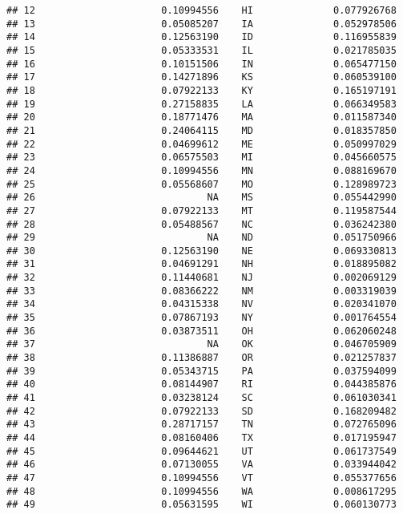 \documentclass{article}\usepackage[]{graphicx}\usepackage[]{color}
\makeatletter
\newenvironment{kframe}{%
 \def\at@end@of@kframe{}%
 \ifinner\ifhmode%
  \def\at@end@of@kframe{\end{minipage}}%
  \begin{minipage}{\columnwidth}%
 \fi\fi%
 \def\FrameCommand##1{\hskip\@totalleftmargin \hskip-\fboxsep
 \colorbox{shadecolor}{##1}\hskip-\fboxsep
     \hskip-\linewidth \hskip-\@totalleftmargin \hskip\columnwidth}%
 \MakeFramed {\advance\hsize-\width
   \@totalleftmargin\z@ \linewidth\hsize
   \@setminipage}}%
 {\par\unskip\endMakeFramed%
 \at@end@of@kframe}
\newenvironment{knitrout}{}{} %
\makeatother
\begin{document}
\begin{knitrout}
\begin{kframe}
\begin{verbatim}
## 12                      0.10994556    HI              0.077926768
## 13                      0.05085207    IA              0.052978506
## 14                      0.12563190    ID              0.116955839
## 15                      0.05333531    IL              0.021785035
## 16                      0.10151506    IN              0.065477150
## 17                      0.14271896    KS              0.060539100
## 18                      0.07922133    KY              0.165197191
## 19                      0.27158835    LA              0.066349583
## 20                      0.18771476    MA              0.011587340
## 21                      0.24064115    MD              0.018357850
## 22                      0.04699612    ME              0.050997029
## 23                      0.06575503    MI              0.045660575
## 24                      0.10994556    MN              0.088169670
## 25                      0.05568607    MO              0.128989723
## 26                              NA    MS              0.055442990
## 27                      0.07922133    MT              0.119587544
## 28                      0.05488567    NC              0.036242380
## 29                              NA    ND              0.051750966
## 30                      0.12563190    NE              0.069330813
## 31                      0.04691291    NH              0.018895082
## 32                      0.11440681    NJ              0.002069129
## 33                      0.08366222    NM              0.003319039
## 34                      0.04315338    NV              0.020341070
## 35                      0.07867193    NY              0.001764554
## 36                      0.03873511    OH              0.062060248
## 37                              NA    OK              0.046705909
## 38                      0.11386887    OR              0.021257837
## 39                      0.05343715    PA              0.037594099
## 40                      0.08144907    RI              0.044385876
## 41                      0.03238124    SC              0.061030341
## 42                      0.07922133    SD              0.168209482
## 43                      0.28717157    TN              0.072765096
## 44                      0.08160406    TX              0.017195947
## 45                      0.09644621    UT              0.061737549
## 46                      0.07130055    VA              0.033944042
## 47                      0.10994556    VT              0.055377656
## 48                      0.10994556    WA              0.008617295
## 49                      0.05631595    WI              0.060130773

\end{verbatim}
\end{kframe}
\end{knitrout}
\end{document}
